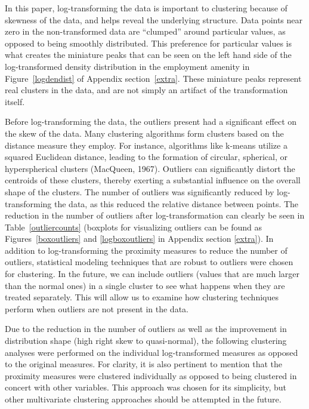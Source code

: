 \documentclass[11pt, a4paper]{article}
\begin{document}
In this paper, log-transforming the data is important to clustering because of skewness of the data, and helps reveal the underlying structure. Data points near zero in the non-transformed data are ``clumped'' around particular values, as opposed to being smoothly distributed. This preference for particular values is what creates the miniature peaks that can be seen on the left hand side of the log-transformed density distribution in the employment amenity in Figure~\ref{logdendist} of Appendix section~\ref{extra}. These miniature peaks represent real clusters in the data, and are not simply an artifact of the transformation itself.
\par
Before log-transforming the data, the outliers present had a significant effect on the skew of the data. Many clustering algorithms form clusters based on the distance measure they employ. For instance, algorithms like k-means utilize a squared Euclidean distance, leading to the formation of circular, spherical, or hyperspherical clusters (MacQueen, 1967). Outliers can significantly distort the centroids of these clusters, thereby exerting a substantial influence on the overall shape of the clusters. The number of outliers was significantly reduced by log-transforming the data, as this reduced the relative distance between points. The reduction in the number of outliers after log-transformation can clearly be seen in Table~\ref{outliercounts} (boxplots for visualizing outliers can be found as Figures~\ref{boxoutliers} and \ref{logboxoutliers} in Appendix section \ref{extra}). In addition to log-transforming the proximity measures to reduce the number of outliers, statistical modeling techniques that are robust to outliers were chosen for clustering. In the future, we can include outliers (values that are much larger than the normal ones) in a single cluster to see what happens when they are treated separately. This will allow us to examine how clustering techniques perform when outliers are not present in the data.
\par
Due to the reduction in the number of outliers as well as the improvement in distribution shape (high right skew to quasi-normal), the following clustering analyses were performed on the individual log-transformed measures as opposed to the original measures. For clarity, it is also pertinent to mention that the proximity measures were clustered individually as opposed to being clustered in concert with other variables. This approach was chosen for its simplicity, but other multivariate clustering approaches should be attempted in the future.
\end{document}
